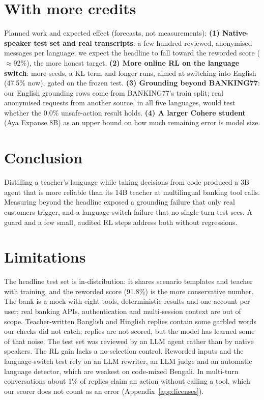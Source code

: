 \documentclass[11pt]{article}
\begin{document}
\section{With more credits}

Planned work and expected effect (forecasts, not measurements):
\textbf{(1) Native-speaker test set and real transcripts}: a few hundred reviewed, anonymised messages per language;
we expect the headline to fall toward the reworded score ($\approx$92\%), the more honest target.
\textbf{(2) More online RL on the language switch}: more seeds, a KL term and longer runs, aimed at switching
into English (47.5\% now), gated on the frozen test.
\textbf{(3) Grounding beyond BANKING77}: our English grounding rows come from BANKING77's train split; real
anonymised requests from another source, in all five languages, would test whether the 0.0\% unsafe-action result holds.
\textbf{(4) A larger Cohere student} (Aya Expanse 8B) as an upper bound on how much remaining error is model size.

\section{Conclusion}

Distilling a teacher's language while taking decisions from code produced a 3B agent that is more reliable than its
14B teacher at multilingual banking tool calls. Measuring beyond the headline exposed a grounding failure that only
real customers trigger, and a language-switch failure that no single-turn test sees. A guard and a few small, audited RL
steps address both without regressions.

\section*{Limitations}

The headline test set is in-distribution: it shares scenario templates and teacher with training, and the reworded
score (91.8\%) is the more conservative number. The bank is a mock with eight tools, deterministic results and one
account per user; real banking APIs, authentication and multi-session context are out of scope. Teacher-written
Banglish and Hinglish replies contain some garbled words our checks did not catch; replies are not scored, but the
model has learned some of that noise. The test set was reviewed by an LLM agent rather than by native speakers. The RL
gain lacks a no-selection control. Reworded inputs and the language-switch test rely on an LLM rewriter, an LLM judge
and an automatic language detector, which are weakest on code-mixed Bengali. In multi-turn conversations about 1\% of replies claim an action
without calling a tool, which our scorer does not count as an error (Appendix~\ref{app:licenses}).
\end{document}
